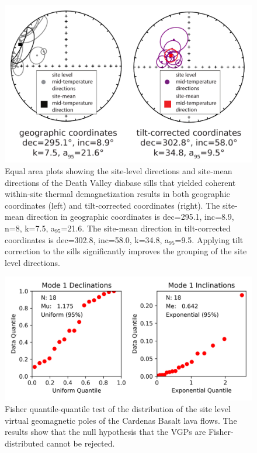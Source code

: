 \documentclass[11pt,letterpaper]{article}
\begin{document}
\begin{figure}[h!]
\noindent\includegraphics[width=5.8 in]{SI_tilt_test.pdf}
\caption[Death Valley diabase sill paleomagnetic tilt test]{Equal area plots showing the site-level directions and site-mean directions of the Death Valley diabase sills that yielded coherent within-site thermal demagnetization results in both geographic coordinates (left) and tilt-corrected coordinates (right). The site-mean direction in geographic coordinates is dec=295.1\textdegree, inc=8.9\textdegree, n=8, k=7.5, a$_{95}$=21.6\textdegree. The site-mean direction in tilt-corrected coordinates is dec=302.8\textdegree, inc=58.0\textdegree, k=34.8, a$_{95}$=9.5\textdegree. Applying tilt correction to the sills significantly improves the grouping of the site level directions. }
\label{fig:DV_tilt_test}
\end{figure}

\begin{figure}[h!]
\noindent\includegraphics[width=5.8 in]{SI_Cardenas_QQ.png}
\caption[Cardenas Basalt VGPs Fisher distribution test]{Fisher quantile-quantile \cite{Fisher1987a} test of the distribution of the site level virtual geomagnetic poles of the Cardenas Basalt lava flows. The results show that the null hypothesis that the VGPs are Fisher-distributed cannot be rejected.}
\label{fig:Cardenas_QQ}
\end{figure}
\end{document}
